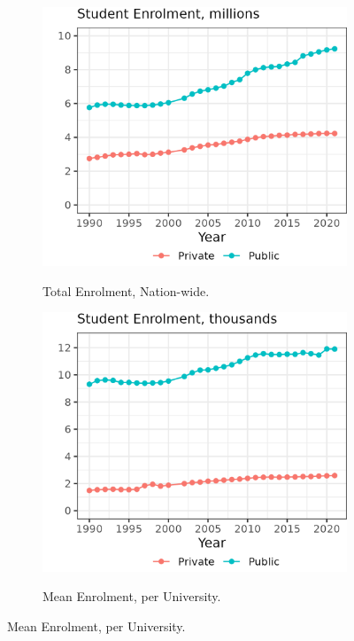 \begin{figure}[!htbp]
    \centering
    \singlespacing
    \caption{Total Student enrolment, by University Sector and Year.}
    \begin{subfigure}[b]{0.495\textwidth}
        \centering
        \caption{Total Enrolment, Nation-wide.}
        \includegraphics[width=\textwidth]{figures/enrollment-total.png}
        \label{fig:enrollment-total}
    \end{subfigure}
    \begin{subfigure}[b]{0.495\textwidth}
        \centering
        \caption{Mean Enrolment, per University.}
        \includegraphics[width=\textwidth]{figures/enrollment-mean.png}
        \label{fig:enrollment-mean}
    \end{subfigure}
    \label{fig:enrolment}
\end{figure}

